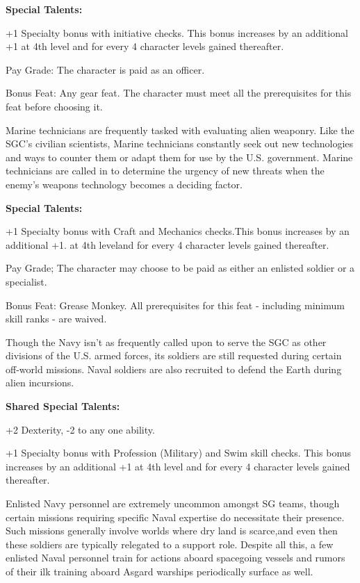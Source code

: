 \textbf{Special Talents:}
\begin{itemize*}
\item +1 Specialty bonus with initiative checks. This bonus increases by an additional +1 at 4th level and for every 4 character levels gained thereafter.
\item Pay Grade: The character is paid as an officer.
\item Bonus Feat: Any gear feat. The character must meet all the prerequisites for this feat before choosing it.
\end{itemize*}

Marine technicians are frequently tasked with evaluating alien weaponry. Like the SGC's civilian scientists, Marine technicians constantly seek out new technologies and ways to counter them or adapt them for use by the U.S. government. Marine technicians are called in to determine the urgency of new threats when the enemy's weapons technology becomes a deciding factor.

\textbf{Special Talents:}
\begin{itemize*}
\item +1 Specialty bonus with Craft and Mechanics checks.This bonus increases by an additional +1. at 4th leveland for every 4 character levels gained thereafter.
\item Pay Grade; The character may choose to be paid as either an enlisted soldier or a specialist.
\item Bonus Feat: Grease Monkey. All prerequisites for this feat - including minimum skill ranks - are waived.
\end{itemize*}

Though the Navy isn't as frequently called upon to serve the SGC as other divisions of the U.S. armed forces, its soldiers are still requested during certain off-world missions. Naval soldiers are also recruited to defend the Earth during alien incursions.

\textbf{Shared Special Talents:}
\begin{itemize*}
\item +2 Dexterity, -2 to any one ability.
\item +1 Specialty bonus with Profession (Military) and Swim skill checks. This bonus increases by an additional +1 at 4th level and for every 4 character levels gained thereafter.
\end{itemize*}

Enlisted Navy personnel are extremely uncommon amongst SG teams, though certain missions requiring specific Naval expertise do necessitate their presence. Such missions generally involve worlds where dry land is scarce,and even then these soldiers are typically relegated to a support role. Despite all this, a few enlisted Naval personnel train for actions aboard spacegoing vessels and rumors of their ilk training aboard Asgard warships periodically surface as well.

